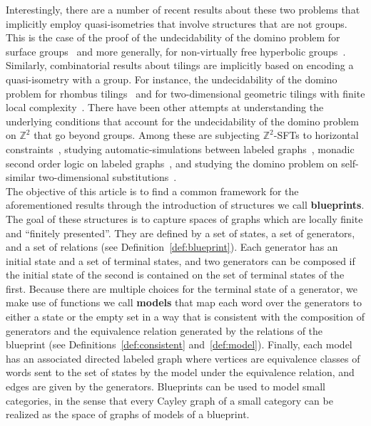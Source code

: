 \documentclass{article}
\theoremstyle{definition}
\theoremstyle{definition}
\newcommand{\Z}{\mathbb{Z}}
\newcommand{\define}[1]{\textbf{#1}}
\begin{document}
Interestingly, there are a number of recent results about these two problems that implicitly employ quasi-isometries that involve structures that are not groups. This is the case of the proof of the undecidability of the domino problem for surface groups~\cite{aubrun2019domino} and more generally, for non-virtually free hyperbolic groups~\cite{bartholdi2023domino}. Similarly, combinatorial results about tilings are implicitly based on encoding a quasi-isometry with a group. For instance, the undecidability of the domino problem for rhombus tilings~\cite{hellouin2023domino} and for two-dimensional geometric tilings with finite local complexity~\cite{de2024decision}. There have been other attempts at understanding the underlying conditions that account for the undecidability of the domino problem on $\Z^2$ that go beyond groups. Among these are subjecting $\Z^2$-SFTs to horizontal constraints~\cite{aubrun2020domino,esnay2023parametrization}, studying automatic-simulations between labeled graphs~\cite{bartholdi2020simulations}, monadic second order logic on labeled graphs~\cite{bartholdi2022monadic}, and studying the domino problem on self-similar two-dimensional substitutions~\cite{barbieri2016domino}.\\


The objective of this article is to find a common framework for the aforementioned results through the introduction of structures we call \define{blueprints}. The goal of these structures is to capture spaces of graphs which are locally finite and ``finitely presented''. They are defined by a set of states, a set of generators, and a set of relations (see Definition~\ref{def:blueprint}). Each generator has an initial state and a set of terminal states, and two generators can be composed if the initial state of the second is contained on the set of terminal states of the first. Because there are multiple choices for the terminal state of a generator, we make use of functions we call \define{models} that map each word over the generators to either a state or the empty set in a way that is consistent with the composition of generators and the equivalence relation generated by the relations of the blueprint (see Definitions~\ref{def:consistent} and~\ref{def:model}). Finally, each model has an associated directed labeled graph where vertices are equivalence classes of words sent to the set of states by the model under the equivalence relation, and edges are given by the generators. Blueprints can be used to model small categories, in the sense that every Cayley graph of a small category can be realized as the space of graphs of models of a blueprint. 
\end{document}
